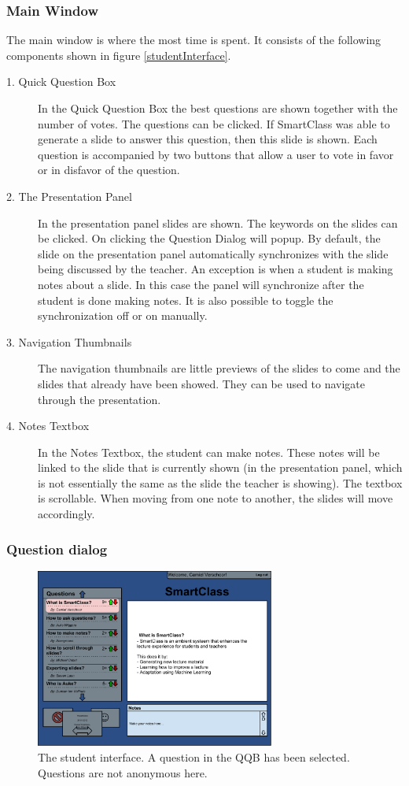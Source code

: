 \documentclass[11pt]{article}
\begin{document}
\subsubsection{Main Window}
The main window is where the most time is spent. It consists of the following components shown in figure \ref{studentInterface}.
\begin{description}
\item[1. Quick Question Box] In the Quick Question Box the best questions are shown together with the number of votes. The questions can be clicked. If SmartClass was able to generate a slide to answer this question, then this slide is shown. Each question is accompanied by two buttons that allow a user to vote in favor or in disfavor of the question. 
\item[2. The Presentation Panel] In the presentation panel slides are shown. The keywords on the slides can be clicked. On clicking the Question Dialog will popup. By default, the slide on the presentation panel automatically synchronizes with the slide being discussed by the teacher. An exception is when a student is making notes about a slide. In this case the panel will synchronize after the student is done making notes. It is also possible to toggle the synchronization off or on manually.  
\item[3. Navigation Thumbnails] The navigation thumbnails are little previews of the slides to come and the slides that already have been showed. They can be used to navigate through the presentation.
\item[4. Notes Textbox] In the Notes Textbox, the student can make notes. These notes will be linked to the slide that is currently shown (in the presentation panel, which is not essentially the same as the slide the teacher is showing). The textbox is scrollable. When moving from one note to another, the slides will move accordingly. 
\end{description}

\subsubsection{Question dialog}

\begin{figure}[!h]
\centering
\includegraphics[width=0.7\textwidth]{studentInterfaceAnswer.pdf}
\caption{The student interface. A question in the QQB has been selected. Questions are not anonymous here.}
\label{studentInterfaceAnswer}
\end{figure}
\end{document}
